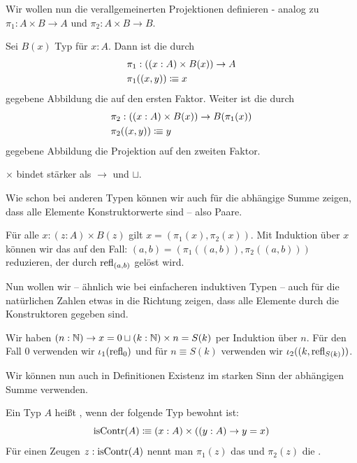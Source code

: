 Wir wollen nun die verallgemeinerten Projektionen definieren - analog zu $\pi_1:A\times B\to A$ und $\pi_2:A\times B\to B$.

\begin{definition}
  Sei $B(x)$ Typ für $x:A$.
  Dann ist die durch
  \begin{align*}
      &\pi_1:((x:A) \times B(x))\to A \\
      &\pi_1((x,y))\vcentcolon\mspace{-1.2mu}\equiv x
  \end{align*}
  gegebene Abbildung die  auf den ersten Faktor.
  Weiter ist die durch
  \begin{align*}
      &\pi_2:((x:A) \times B(x))\to B(\pi_1(x)) \\
      &\pi_2((x,y))\vcentcolon\mspace{-1.2mu}\equiv y
  \end{align*}
  gegebene Abbildung die Projektion auf den zweiten Faktor.
\end{definition}

\begin{konvention}
  $\times$ bindet stärker als $\to$ und $\sqcup$.
\end{konvention}

Wie schon bei anderen Typen können wir auch für die abhängige Summe zeigen, dass alle Elemente Konstruktorwerte sind -- also Paare.

\begin{bemerkung}
  Für alle $x:(z:A)\times B(z)$ gilt $x=(\pi_1(x),\pi_2(x))$.
  Mit Induktion über $x$ können wir das auf den Fall: $(a,b)=(\pi_1((a,b)),\pi_2((a,b)))$ reduzieren, der durch $\mathrm{refl}_{(a,b)}$ gelöst wird.
\end{bemerkung}

Nun wollen wir -- ähnlich wie bei einfacheren induktiven Typen -- auch für die natürlichen Zahlen etwas in die Richtung zeigen, dass alle Elemente durch die Konstruktoren gegeben sind.

\begin{bemerkung}
  Wir haben $(n:\mathbb{N})\to x=0 \sqcup (k:\mathbb{N})\times n=S(k)$ per Induktion über $n$.
  Für den Fall $0$ verwenden wir $\iota_1(\mathrm{refl}_0)$ und für $n\equiv S(k)$ verwenden wir $\iota_2((k,\mathrm{refl}_{S(k)}))$.
\end{bemerkung}

Wir können nun auch in Definitionen Existenz im starken Sinn der abhängigen Summe verwenden.

\begin{definition}
  Ein Typ $A$ heißt \index{$\isContr$}, wenn der folgende Typ bewohnt ist:
\[
  \mathrm{\mathrm{isContr}}(A)\vcentcolon\mspace{-1.2mu}\equiv (x:A)\times ((y:A)\to y=x)
\]
  Für einen Zeugen $z:\mathrm{isContr}(A)$ nennt man $\pi_1(z)$ das 
  und $\pi_2(z)$ die .
\end{definition}

